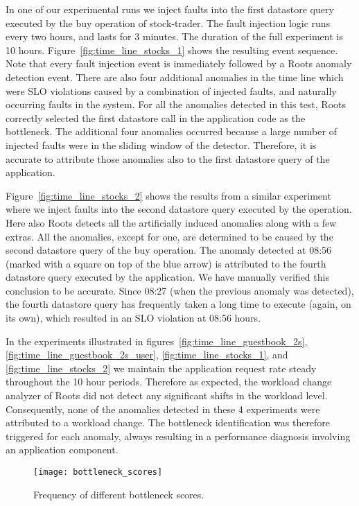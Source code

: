 In one of our experimental runs we inject faults into the first datastore query executed by the buy operation
of stock-trader. The fault injection logic runs every two hours, and lasts for 3 minutes. The duration of
the full experiment is 10 hours. 
Figure~\ref{fig:time_line_stocks_1} shows the resulting event sequence. Note that every fault injection
event is immediately followed by a Roots anomaly detection event. There are also four additional
anomalies in the time line which were SLO violations caused by a combination of injected faults, and
naturally occurring faults in the system. For all the anomalies detected
in this test, Roots correctly selected the first datastore call in the application code as the bottleneck. 
The additional four anomalies occurred because a large number of injected faults were in the sliding window
of the detector. Therefore, it is accurate to attribute those anomalies also to the first datastore query
of the application.

Figure~\ref{fig:time_line_stocks_2} shows the results from a similar experiment where we inject
faults into the second datastore query executed by the operation. Here also Roots detects all the
artificially induced anomalies along with a few extras. All the anomalies, except for one, 
are determined to be caused by the second
datastore query of the buy operation. The anomaly detected at 08:56 (marked with a square on top of the blue arrow) 
is attributed to the fourth datastore query executed by the application. We have manually verified this
conclusion to be accurate. Since 08:27 (when the previous anomaly was detected), the fourth datastore
query has frequently taken a long time to execute (again, on
its own), which resulted in an SLO violation at 08:56 hours.

In the experiments illustrated in figures~\ref{fig:time_line_guestbook_2s}, \ref{fig:time_line_guestbook_2s_user}, 
\ref{fig:time_line_stocks_1}, and \ref{fig:time_line_stocks_2} we maintain
the application request rate steady throughout the 10 hour periods. Therefore as expected,
the workload change analyzer of Roots did not detect any significant shifts in the workload level. 
Consequently, none of the anomalies detected in these 4 experiments were attributed to a workload change.
The bottleneck identification was therefore triggered for each anomaly, always resulting in a performance diagnosis
involving an application component.

\begin{figure}
\centering
\texttt{[image: bottleneck\_scores]}
\caption{Frequency of different bottleneck scores.}
\label{fig:bottleneck_scores}
\end{figure}

